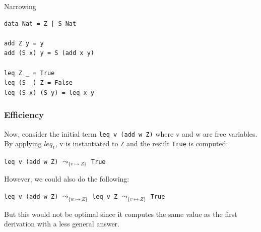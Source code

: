 \documentclass{beamer}
\begin{document}
\begin{section}{Narrowing}
\begin{frame}
\begin{example}

\begin{verbatim}
data Nat = Z | S Nat

add Z y = y
add (S x) y = S (add x y)

leq Z _ = True
leq (S _) Z = False
leq (S x) (S y) = leq x y
\end{verbatim}

\end{example}
\end{frame}

\begin{frame}[fragile]
\frametitle{Efficiency}
  Now, consider the initial term \verb|leq v (add w Z)| where v and w are free variables. By applying $leq_1$, v is instantiated to \verb|Z| and the result \verb|True| is computed:

\begin{center}

\verb|leq v (add w Z)| $\leadsto_{\{v\mapsto Z\}}$ \verb|True|
  
\end{center}

However, we could also do the following:

\begin{center}

\verb|leq v (add w Z)| $\leadsto_{\{w\mapsto Z\}}$ \verb|leq v Z| $\leadsto_{\{v\mapsto Z\}}$ \verb|True|
  
\end{center}

But this would not be optimal since it computes the same value as the first derivation with a less general answer.

\end{frame}

\end{section}
\end{document}
